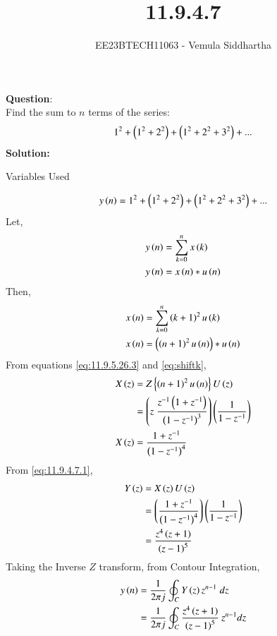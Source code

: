 \documentclass[journal,12pt,twocolumn]{IEEEtran}
\theoremstyle{remark}
\begin{document}

\vspace{3cm}

\title{11.9.4.7}
\author{EE23BTECH11063 - Vemula Siddhartha
}
\maketitle
\newpage
\bigskip

\renewcommand{\thefigure}{\theenumi}
\renewcommand{\thetable}{\theenumi}
\textbf{Question}:\\
Find the sum to $n$ terms of the series:
\begin{align*}
    1^2+\left(1^2+2^2\right)+\left(1^2+2^2+3^2\right)+...
\end{align*}
\textbf{Solution:}
\begin{table}[h!]    
    \centering
    
    \caption{Variables Used}
    \label{tab10.5.3.9.1}
  \end{table}
\begin{align}
    y\left(n\right)&=1^2+\left(1^2+2^2\right)+\left(1^2+2^2+3^2\right)+...\\
\end{align}
Let,
\begin{align}
    y\left(n\right)&=\sum_{k=0}^{n}x\left(k\right)\\
    y\left(n\right)&=x\left(n\right)*u\left(n\right)\label{eq:11.9.4.7.1}
\end{align}
Then,
\begin{align}
    x\left(n\right)&=\sum_{k=0}^{n}\left(k+1\right)^2u\left(k\right)\\
    x\left(n\right)&=\left(\left(n+1\right)^2u\left(n\right)\right)*u\left(n\right)
\end{align}
From equations \eqref{eq:11.9.5.26.3} and \eqref{eq:shiftk},
\begin{align}
    X\left(z\right)&=Z\left\{\left(n+1\right)^2u\left(n\right)\right\}U\left(z\right)\\
    &=\left(z\;\frac{z^{-1}\left(1+z^{-1}\right)}{\left(1-z^{-1}\right)^3}\right)\left(\frac{1}{1-z^{-1}}\right)\\
    X\left(z\right)&=\frac{1+z^{-1}}{\left(1-z^{-1}\right)^4}
\end{align}
From \eqref{eq:11.9.4.7.1},
\begin{align}
    Y\left(z\right)&=X\left(z\right)U\left(z\right)\\
    &=\left(\frac{1+z^{-1}}{\left(1-z^{-1}\right)^4}\right)\left(\frac{1}{1-z^{-1}}\right)\\
    &=\frac{z^4\left(z+1\right)}{\left(z-1\right)^5}
\end{align}
Taking the Inverse $Z$ transform, from Contour Integration,
\begin{align}
    y\left(n\right)&=\frac{1}{2\pi j}\oint_C Y\left(z\right)z^{n-1}\;dz\\
    &=\frac{1}{2\pi j}\oint_C\frac{z^4\left(z+1\right)}{\left(z-1\right)^5}\:z^{n-1}dz\\
\end{align}
\end{document}

